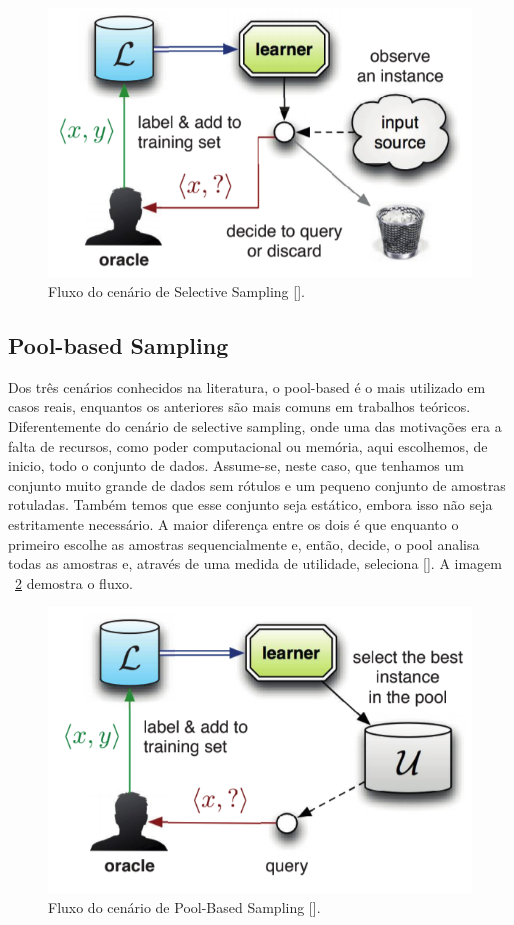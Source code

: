 \begin{figure}
  \centering
  \includegraphics[width=.5\textwidth]{figures/settles_2014_selective_sampling.png}
  \caption{Fluxo do cenário de Selective Sampling [\cite{settles2014active}].}
  \label{fig:settles_2014_selective_sampling}
\end{figure}



\subsection{Pool-based Sampling}
\label{sec:cenarios_pool}

Dos três cenários conhecidos na literatura, o pool-based é o mais utilizado em casos reais, enquantos os anteriores são mais comuns em trabalhos teóricos. Diferentemente do cenário de selective sampling, onde uma das motivações era a falta de recursos, como poder computacional ou memória, aqui escolhemos, de inicio, todo o conjunto de dados. Assume-se, neste caso, que tenhamos um conjunto muito grande de dados sem rótulos e um pequeno conjunto de amostras rotuladas. Também temos que esse conjunto seja estático, embora isso não seja estritamente necessário. A maior diferença entre os dois é que enquanto o primeiro escolhe as amostras sequencialmente e, então, decide, o pool analisa todas as amostras e, através de uma medida de utilidade, seleciona [\cite{settles2014active}]. A imagem ~\ref{fig:settles_2014_pool}  demostra o fluxo.

\begin{figure}
  \centering
  \includegraphics[width=.5\textwidth]{figures/settles_2014_pool.png}
  \caption{Fluxo do cenário de Pool-Based Sampling [\cite{settles2014active}].}
  \label{fig:settles_2014_pool}
\end{figure}

